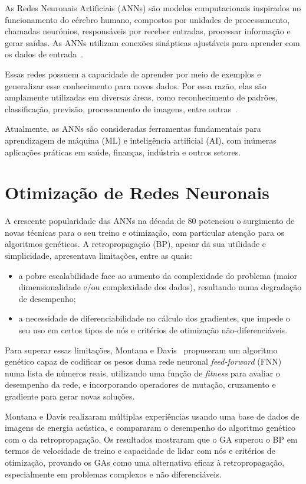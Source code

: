 As Redes Neuronais Artificiais (ANNs) são modelos computacionais inspirados no funcionamento do cérebro humano, compostos por unidades de processamento, chamadas neurónios, responsáveis por receber entradas, processar informação e gerar saídas.
As ANNs utilizam conexões sinápticas ajustáveis para aprender com os dados de entrada~\cite{Lippmann1988AnNets}.

Essas redes possuem a capacidade de aprender por meio de exemplos e generalizar esse conhecimento para novos dados.
Por essa razão, elas são amplamente utilizadas em diversas áreas, como reconhecimento de padrões, classificação, previsão, processamento de imagens, entre outras~\cite{Jain1996ArtificialTutorial}.

Atualmente, as ANNs são consideradas ferramentas fundamentais para aprendizagem de máquina (ML) e inteligência artificial (AI), com inúmeras aplicações práticas em saúde, finanças, indústria e outros setores.

\section{Otimização de Redes Neuronais}\label{sec:optim_nns}

A crescente popularidade das ANNs na década de 80 potenciou o surgimento de novas técnicas para o seu treino e otimização, com particular atenção para os algoritmos genéticos.
A retropropagação (BP), apesar da sua utilidade e simplicidade, apresentava limitações, entre as quais:
\begin{itemize}
    \item a pobre escalabilidade face ao aumento da complexidade do problema (maior dimensionalidade e/ou complexidade dos dados), resultando numa degradação de desempenho;
    \item a necessidade de diferenciabilidade no cálculo dos gradientes, que impede o seu uso em certos tipos de nós e critérios de otimização não-diferenciáveis.
\end{itemize}

Para superar essas limitações, Montana e Davis~\cite{Montana1989} propuseram um algoritmo genético capaz de codificar os pesos duma rede neuronal \textit{feed-forward} (FNN) numa lista de números reais, utilizando uma função de \textit{fitness} para avaliar o desempenho da rede, e incorporando operadores de mutação, cruzamento e gradiente para gerar novas soluções. 

Montana e Davis realizaram múltiplas experiências usando uma base de dados de imagens de energia acústica, e compararam o desempenho do algoritmo genético com o da retropropagação.
Os resultados mostraram que o GA superou o BP em termos de velocidade de treino e capacidade de lidar com nós e critérios de otimização, provando os GAs como uma alternativa eficaz à retropropagação, especialmente em problemas complexos e não diferenciáveis.